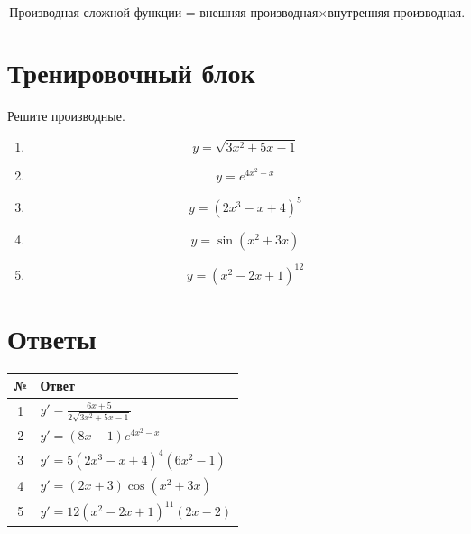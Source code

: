 \documentclass[a4paper,12pt]{article}
\begin{document}
\[
\boxed{
\text{Производная сложной функции = внешняя производная}\times
\text{внутренняя производная.}
}
\]

\clearpage

\section*{Тренировочный блок}

Решите производные.

\begin{enumerate}
\item
\[
y=\sqrt{3x^2+5x-1}
\]

\item
\[
y=e^{4x^2-x}
\]

\item
\[
y=(2x^3-x+4)^5
\]

\item
\[
y=\sin(x^2+3x)
\]

\item
\[
y=(x^2-2x+1)^{12}
\]
\end{enumerate}

\clearpage

\section*{Ответы}

\renewcommand{\arraystretch}{1.35}

\begin{center}
\begin{tabularx}{\linewidth}{cX}
\toprule
№ & Ответ\\
\midrule
1 &
$\displaystyle
y'=\frac{6x+5}{2\sqrt{3x^2+5x-1}}
$\\

2 &
$\displaystyle
y'=(8x-1)e^{4x^2-x}
$\\

3 &
$\displaystyle
y'=5(2x^3-x+4)^4(6x^2-1)
$\\

4 &
$\displaystyle
y'=(2x+3)\cos(x^2+3x)
$\\

5 &
$\displaystyle
y'=12(x^2-2x+1)^{11}(2x-2)
$\\
\bottomrule
\end{tabularx}
\end{center}
\end{document}
